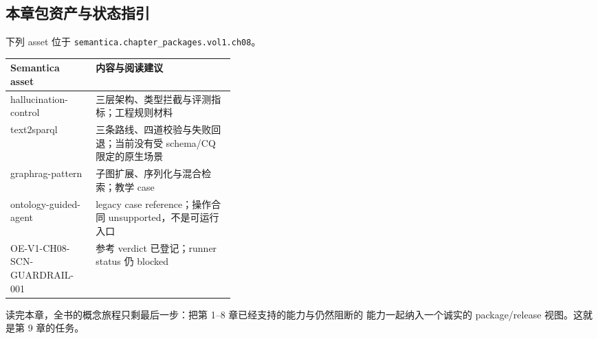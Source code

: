 \subsection{本章包资产与状态指引}

下列 asset 位于 \texttt{semantica.chapter\_packages.vol1.ch08}。

\begin{center}
\begin{tabularx}{\linewidth}{@{}>{\ttfamily\footnotesize}p{0.38\linewidth}X@{}}
\toprule
\normalfont\textbf{Semantica asset} & \textbf{内容与阅读建议} \\
\midrule
hallucination-control & 三层架构、类型拦截与评测指标；工程规则材料 \\
text2sparql & 三条路线、四道校验与失败回退；当前没有受 schema/CQ 限定的原生场景 \\
graphrag-pattern & 子图扩展、序列化与混合检索；教学 case \\
ontology-guided-agent & legacy case reference；操作合同 unsupported，不是可运行入口 \\
OE-V1-CH08-SCN-GUARDRAIL-001 & 参考 verdict 已登记；runner status 仍 blocked \\
\bottomrule
\end{tabularx}
\end{center}

读完本章，全书的概念旅程只剩最后一步：把第 1--8 章已经支持的能力与仍然阻断的
能力一起纳入一个诚实的 package/release 视图。这就是第 9 章的任务。
